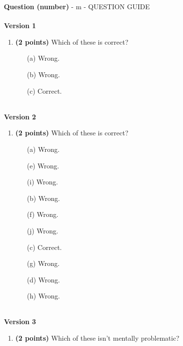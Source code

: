 \documentclass[12pt]{amsart}
\begin{document}
\graphicspath{{/Users/jilan/Downloads/Randomizer/Randomizer/Sample Course/Sample Assessment/}}{\Large{\bf Question (number)}} - m - QUESTION GUIDE \\$ $ \\ {\bf Version 1} \\\begin{enumerate}[resume]
\item {\bf (2 points)} 
 Which of these is correct?

\begin{minipage}[t]{1.0\linewidth}\begin{multicols}{3}\begin{itemize}\item[(a)]  Wrong. \item[(b)]  Wrong. \item[(c)]  Correct. \end{itemize}\end{multicols}\end{minipage} \vfill \end{enumerate}$ $ \\ {\bf Version 2} \\\begin{enumerate}[resume]
\item {\bf (2 points)} 
 Which of these is correct?

\begin{minipage}[t]{1.0\linewidth}\begin{multicols}{4}\begin{itemize}\item[(a)]  Wrong. \item[(e)]  Wrong. \item[(i)]  Wrong. \item[(b)]  Wrong. \item[(f)]  Wrong. \item[(j)]  Wrong. \item[(c)]  Correct. \item[(g)]  Wrong. \item[] \item[(d)]  Wrong. \item[(h)]  Wrong. \item[] \end{itemize}\end{multicols}\end{minipage} \vfill \end{enumerate}$ $ \\ {\bf Version 3} \\\begin{enumerate}[resume]
\item {\bf (2 points)} 
 Which of these isn't mentally problematic?


\end{enumerate}
\end{document}
